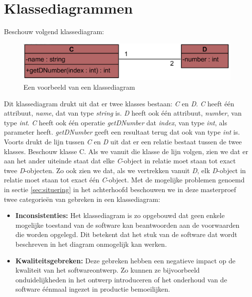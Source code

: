 \section{Klassediagrammen}

Beschouw volgend klassediagram:

\begin{figure}[H]
	\label{fig:cd}
	\centering
	\includegraphics{intro/cd.png}
	\caption{Een voorbeeld van een klassediagram}
\end{figure}

Dit klassediagram drukt uit dat er twee klasses bestaan: \textit{C} en \textit{D}. \textit{C} heeft \'e\'en attribuut, \textit{name}, dat van type \textit{string} is. \textit{D} heeft ook \'e\'en attribuut, \textit{number}, van type \textit{int}. \textit{C} heeft ook \'e\'en operatie \textit{getDNumber} dat \textit{index}, van type \textit{int}, als parameter heeft. \textit{getDNumber} geeft een resultaat terug dat ook van type \textit{int} is. Voorts drukt de lijn tussen \textit{C} en \textit{D} uit dat er een relatie bestaat tussen de twee klasses. Beschouw klasse C. Als we vanuit die klasse de lijn volgen, zien we dat er aan het ander uiteinde staat dat elke \textit{C}-object in relatie moet staan tot exact twee \textit{D}-objecten. Zo ook zien we dat, als we vertrekken vanuit \textit{D}, elk \textit{D}-object in relatie moet staan tot exact \'e\'en \textit{C}-object.
Met de mogelijke problemen genoemd in sectie \ref{sec:situering} in het achterhoofd beschouwen we in deze masterproef twee categorie\"en van gebreken in een klassediagram:

\begin{itemize}
	\item \textbf{Inconsistenties:} Het klassediagram is zo opgebouwd dat geen enkele mogelijke toestand van de software kan beantwoorden aan de voorwaarden die worden opgelegd. Dit betekent dat het stuk van de software dat wordt beschreven in het diagram onmogelijk kan werken.
	\item \textbf{Kwaliteitsgebreken:} Deze gebreken hebben een negatieve impact op de kwaliteit van het softwareontwerp. Zo kunnen ze bijvoorbeeld onduidelijkheden in het ontwerp introduceren of het onderhoud van de software \'e\'enmaal ingezet in productie bemoeilijken.
\end{itemize}


